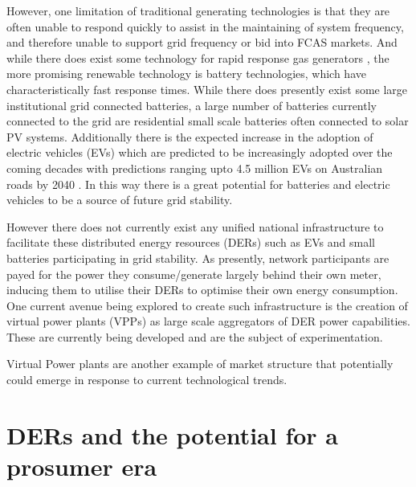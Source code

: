 However, one limitation of traditional generating technologies is that they are often unable to respond quickly to assist in the maintaining of system frequency, and therefore unable to support grid frequency or bid into FCAS markets.
And while there does exist some technology for rapid response gas generators \cite{GONZALEZSALAZAR20181497}, the more promising renewable technology is battery technologies, which have characteristically fast response times.
While there does presently exist some large institutional grid connected batteries, a large number of batteries currently connected to the grid are residential small scale batteries often connected to solar PV systems.
Additionally there is the expected increase in the adoption of electric vehicles (EVs) which are predicted to be increasingly adopted over the coming decades with predictions ranging upto 4.5 million EVs on Australian roads by 2040 \cite{australianenergymarketoperatorlimited2019}.
In this way there is a great potential for batteries and electric vehicles to be a source of future grid stability.

However there does not currently exist any unified national infrastructure to facilitate these distributed energy resources (DERs) such as EVs and small batteries participating in grid stability.
As presently, network participants are payed for the power they consume/generate largely behind their own meter, inducing them to utilise their DERs to optimise their own energy consumption.
One current avenue being explored to create such infrastructure is the creation of virtual power plants (VPPs) as large scale aggregators of DER power capabilities. These are currently being developed and are the subject of experimentation. \cite{australianenergymarketoperatorlimited20188}


Virtual Power plants are another example of market structure that potentially could emerge in response to current technological trends.

\section{DERs and the potential for a prosumer era}

